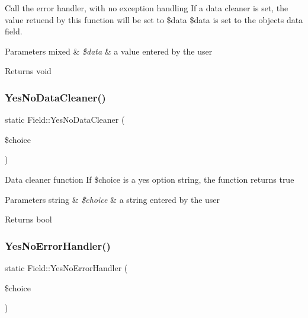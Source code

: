 Call the error handler, with no exception handling If a data cleaner is set, the value retuend by this function will be set to {\ttfamily \$data} {\ttfamily \$data} is set to the object\textquotesingle{}s data field. 


\begin{DoxyParams}[1]{Parameters}
mixed & {\em \$data} & a value entered by the user \\
\hline
\end{DoxyParams}
\begin{DoxyReturn}{Returns}
void 
\end{DoxyReturn}
\mbox{\label{classField_a5f84b56e8ea34c9b15081751366392c8}} 
\subsubsection{\texorpdfstring{Yes\+No\+Data\+Cleaner()}{YesNoDataCleaner()}}
{\footnotesize\ttfamily static Field\+::\+Yes\+No\+Data\+Cleaner (\begin{DoxyParamCaption}\item[{}]{\$choice }\end{DoxyParamCaption})\hspace{0.3cm}{\ttfamily [static]}}

Data cleaner function If \$choice is a \textquotesingle{}yes\textquotesingle{} option string, the function returns true 
\begin{DoxyParams}[1]{Parameters}
string & {\em \$choice} & a string entered by the user \\
\hline
\end{DoxyParams}
\begin{DoxyReturn}{Returns}
bool 
\end{DoxyReturn}
\mbox{\label{classField_a1264ea9bdc12d6d5b6e6189508276ebb}} 
\subsubsection{\texorpdfstring{Yes\+No\+Error\+Handler()}{YesNoErrorHandler()}}
{\footnotesize\ttfamily static Field\+::\+Yes\+No\+Error\+Handler (\begin{DoxyParamCaption}\item[{}]{\$choice }\end{DoxyParamCaption})\hspace{0.3cm}{\ttfamily [static]}}

